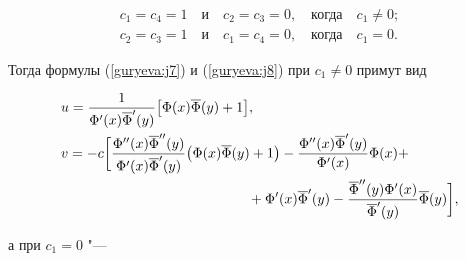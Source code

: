 \begin{gather*}


c_{1}=c_{4}=1 \quad \mbox{и} \quad c_{2}=c_{3}=0, \quad \mbox{


когда} \quad c_{1}\neq 0; \\


c_{2}=c_{3}=1 \quad \mbox{и}\quad c_{1}=c_{4}=0, \quad \mbox{


когда} \quad c_{1}= 0.


\end{gather*}





Тогда формулы (\ref{guryeva:j7}) и (\ref{guryeva:j8}) при $c_{1}\neq 0$  примут вид











\begin{equation} \label{guryeva:j9}


\begin{aligned}


&u= \frac{1}{\Phi'(x)\overline{\Phi}'(y)}\bigl[\Phi(x)\overline{\Phi}(y)


+1 \bigr],


\\


&v=-c\bigg[


\frac{\Phi''(x) \overline{\Phi}''(y)}{\Phi'(x)\overline{\Phi}'(y)} \bigl(\Phi(x)\overline{\Phi}(y)+1 \bigr)


- \frac{\Phi''(x) \overline{\Phi}' (y)}{\Phi'(x)}\Phi(x) +


\\


& \hspace{4.7cm}


+\Phi'(x) \overline{\Phi}'(y)


- \frac{\overline{\Phi}''(y) \Phi' (x)}{\overline{\Phi}'(y)}\overline{\Phi}(y)


\bigg],


\end{aligned}


\end{equation}


а при $c_1=0$ "---


